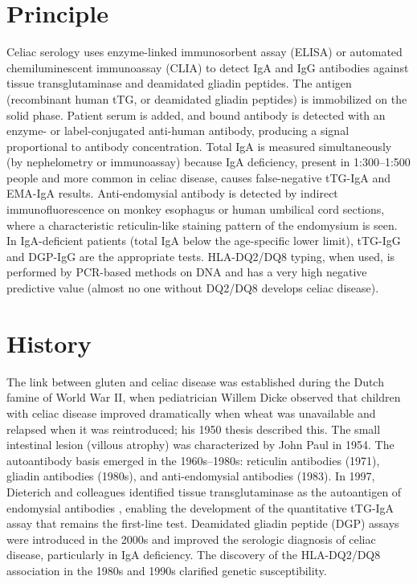 \section*{Principle}
Celiac serology uses enzyme-linked immunosorbent assay (ELISA) or automated chemiluminescent immunoassay (CLIA) to detect IgA and IgG antibodies against tissue transglutaminase and deamidated gliadin peptides. The antigen (recombinant human tTG, or deamidated gliadin peptides) is immobilized on the solid phase. Patient serum is added, and bound antibody is detected with an enzyme- or label-conjugated anti-human antibody, producing a signal proportional to antibody concentration. Total IgA is measured simultaneously (by nephelometry or immunoassay) because IgA deficiency, present in 1:300--1:500 people and more common in celiac disease, causes false-negative tTG-IgA and EMA-IgA results. Anti-endomysial antibody is detected by indirect immunofluorescence on monkey esophagus or human umbilical cord sections, where a characteristic reticulin-like staining pattern of the endomysium is seen. In IgA-deficient patients (total IgA below the age-specific lower limit), tTG-IgG and DGP-IgG are the appropriate tests. HLA-DQ2/DQ8 typing, when used, is performed by PCR-based methods on DNA and has a very high negative predictive value (almost no one without DQ2/DQ8 develops celiac disease).

\section*{History}
The link between gluten and celiac disease was established during the Dutch famine of World War II, when pediatrician Willem Dicke observed that children with celiac disease improved dramatically when wheat was unavailable and relapsed when it was reintroduced; his 1950 thesis described this. The small intestinal lesion (villous atrophy) was characterized by John Paul in 1954. The autoantibody basis emerged in the 1960s--1980s: reticulin antibodies (1971), gliadin antibodies (1980s), and anti-endomysial antibodies (1983). In 1997, Dieterich and colleagues identified tissue transglutaminase as the autoantigen of endomysial antibodies \cite{dieterich1997identification}, enabling the development of the quantitative tTG-IgA assay that remains the first-line test. Deamidated gliadin peptide (DGP) assays were introduced in the 2000s and improved the serologic diagnosis of celiac disease, particularly in IgA deficiency. The discovery of the HLA-DQ2/DQ8 association in the 1980s and 1990s clarified genetic susceptibility.

